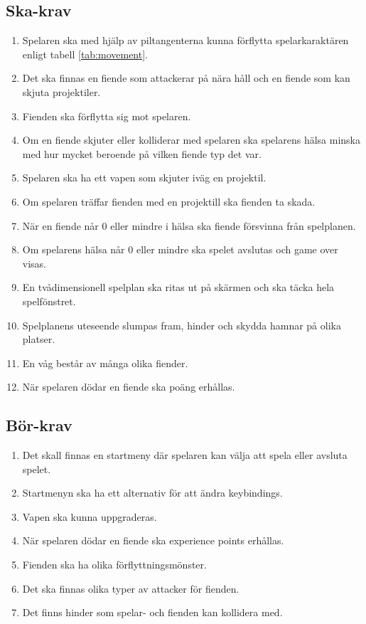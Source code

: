 \documentclass{TDP005mall}
\begin{document}
  \subsection{Ska-krav}
  \begin{enumerate}[label=S\arabic*]
    \item Spelaren ska med hjälp av piltangenterna kunna förflytta spelarkaraktären enligt tabell \ref{tab:movement}.
    \item Det ska finnas en fiende som attackerar på nära håll och en fiende som kan skjuta projektiler.
    \item Fienden ska förflytta sig mot spelaren.
    \item Om en fiende skjuter eller kolliderar med spelaren ska spelarens hälsa minska med hur mycket beroende på vilken fiende typ det var.
    \item Spelaren ska ha ett vapen som skjuter iväg en projektil.
    \item Om spelaren träffar fienden med en projektill ska fienden ta skada.
    \item När en fiende når 0 eller mindre i hälsa ska fiende försvinna från spelplanen.
    \item Om spelarens hälsa når 0 eller mindre ska spelet avslutas och game over visas.
    \item En tvådimensionell spelplan ska ritas ut på skärmen och ska täcka hela spelfönstret.
    \item Spelplanens uteseende slumpas fram, hinder och skydda hamnar på olika platser.
    \item En våg består av många olika fiender.
    \item När spelaren dödar en fiende ska poäng erhållas.
  \end{enumerate}

  \subsection{Bör-krav}
  \begin{enumerate}[label=B\arabic*]
    \item Det skall finnas en startmeny där spelaren kan välja att spela eller avsluta spelet.
    \item Startmenyn ska ha ett alternativ för att ändra keybindings.
    \item Vapen ska kunna uppgraderas.
    \item När spelaren dödar en fiende ska experience points erhållas.
    \item Fienden ska ha olika förflyttningsmönster.
    \item Det ska finnas olika typer av attacker för fienden.
    \item Det finns hinder som spelar- och fienden kan kollidera med.
  \end{enumerate}
\end{document}
